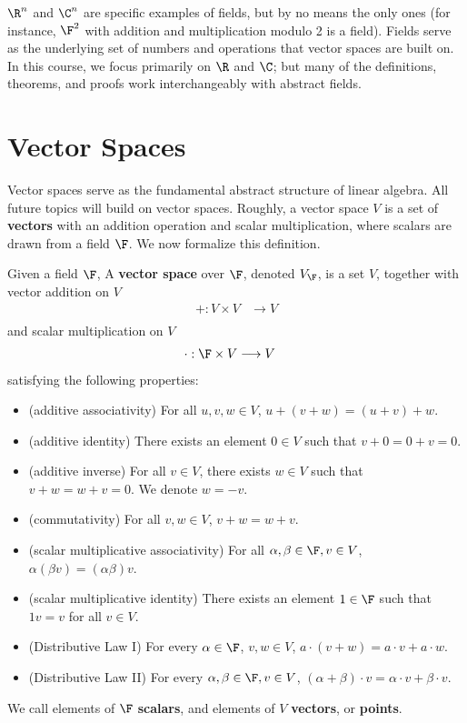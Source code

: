 \documentclass[math0540-lecture-notes.tex]{subfiles}
\begin{document}
$\R^{n}$ and $\C^{n}$ are specific examples of fields, but by no means the only ones (for instance,
$\F^{2}$ with addition and multiplication modulo 2 is a field). Fields serve as the underlying set
of numbers and operations that vector spaces are built on. In this course, we focus primarily on
$\R$ and $\C$; but many of the definitions, theorems, and proofs work interchangeably with abstract
fields.



\section{Vector Spaces}
Vector spaces serve as the fundamental abstract structure of linear algebra. All future topics will
build on vector spaces. Roughly, a vector space $V$ is a set of \textbf{vectors} with an addition
operation and scalar multiplication, where scalars are drawn from a field $\F$. We now formalize
this definition.
\begin{definition}{}
  Given a field $\F$, A \textbf{vector space} over $\F$, denoted $V_\F$, is a set $V$, together with
  vector addition on $V$ \begin{align*}
    +: V\times V &\longrightarrow V\\
  \end{align*} and scalar multiplication on $V$ \begin{align*}
    \cdot : \F\times V &\longrightarrow V
  \end{align*} satisfying the following properties:
  \begin{itemize}
    \item (additive associativity) For all $u,v,w\in V$, $u+(v+w)=(u+v)+w$.
    \item (additive identity) There exists an element $0\in V$ such that $v+0=0+v=0$.
    \item (additive inverse) For all $v\in V$, there exists $w\in V$ such that $v+w=w+v=0$. We
      denote $w=-v$.
    \item (commutativity) For all $v,w\in V$, $v+w=w+v$.
    \item (scalar multiplicative associativity) For all $ \alpha,\beta\in \F, v\in V$,
      $\alpha(\beta v)=(\alpha\beta)v$.
    \item (scalar multiplicative identity) There exists an element $1\in \F$ such that $1v=v$ for
      all  $v\in V$.
    \item (Distributive Law I) For every $ \alpha\in \F$, $v,w\in V$, $a\cdot (v+w)=a\cdot v+a\cdot
      w$.
    \item (Distributive Law II) For every $\alpha,\beta\in \F, v\in V$, $(\alpha+\beta)\cdot
      v=\alpha\cdot v+\beta\cdot v$.
  \end{itemize}
  We call elements of $\F$ \textbf{scalars}, and elements of $V$ \textbf{vectors}, or
  \textbf{points}.
\end{definition}
\end{document}
